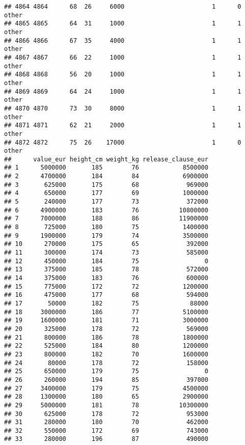 \documentclass[
]{article}
\begin{document}
\begin{verbatim}
## 4864 4864      68  26     6000                        1      0    other
## 4865 4865      64  31     1000                        1      1    other
## 4866 4866      67  35     4000                        1      1    other
## 4867 4867      66  22     1000                        1      1    other
## 4868 4868      56  20     1000                        1      1    other
## 4869 4869      64  24     1000                        1      1    other
## 4870 4870      73  30     8000                        1      1    other
## 4871 4871      62  21     2000                        1      1    other
## 4872 4872      75  26    17000                        1      0    other
##      value_eur height_cm weight_kg release_clause_eur
## 1      5000000       185        76            8500000
## 2      4700000       184        84            6900000
## 3       625000       175        68             969000
## 4       650000       177        69            1000000
## 5       240000       177        73             372000
## 6      4900000       183        76           10800000
## 7      7000000       188        86           11900000
## 8       725000       180        75            1400000
## 9      1900000       179        74            3500000
## 10      270000       175        65             392000
## 11      300000       174        73             585000
## 12      450000       184        75                  0
## 13      375000       185        78             572000
## 14      375000       183        76             600000
## 15      775000       172        72            1200000
## 16      475000       177        68             594000
## 17       50000       182        75              88000
## 18     3000000       186        77            5100000
## 19     1600000       181        71            3000000
## 20      325000       178        72             569000
## 21      800000       186        78            1800000
## 22      525000       184        80            1200000
## 23      800000       182        70            1600000
## 24       80000       178        72             158000
## 25      650000       179        75                  0
## 26      260000       194        85             397000
## 27     3400000       179        75            4500000
## 28     1300000       180        65            2900000
## 29     5000000       181        78           10300000
## 30      625000       178        72             953000
## 31      280000       180        70             462000
## 32      550000       172        69             743000
## 33      280000       196        87             490000

\end{verbatim}
\end{document}
